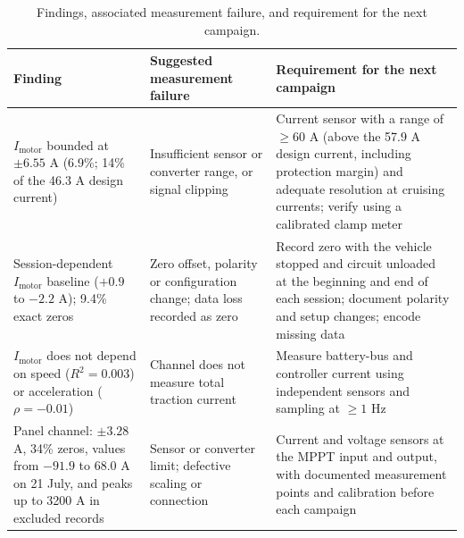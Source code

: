 \documentclass[vehicles,article,submit,moreauthors]{Definitions/mdpi}
\begin{document}
\begin{table}[H]
    \caption{Findings, associated measurement failure, and requirement for the next campaign.\label{tab:hallazgos}}
    \footnotesize
    \setlength{\tabcolsep}{3pt}
    \renewcommand{\arraystretch}{1.1}
    \begin{tabular}{p{4.0cm} p{3.9cm} p{5.6cm}}
        \toprule
        \textbf{Finding} & \textbf{Suggested measurement failure}                                                                                                                                                       & \textbf{Requirement for the next campaign} \\
        \midrule
        $I_{\mathrm{motor}}$ bounded at $\pm 6.55$ A (6.9\%; 14\% of the 46.3 A design current)
                         & Insufficient sensor or converter range, or signal clipping
                         & Current sensor with a range of $\ge 60$ A (above the 57.9 A design current, including protection margin) and adequate resolution at cruising currents; verify using a calibrated clamp meter                                              \\
        Session-dependent $I_{\mathrm{motor}}$ baseline ($+0.9$ to $-2.2$ A); 9.4\% exact zeros
                         & Zero offset, polarity or configuration change; data loss recorded as zero
                         & Record zero with the vehicle stopped and circuit unloaded at the beginning and end of each session; document polarity and setup changes; encode missing data                                                                              \\
        $I_{\mathrm{motor}}$ does not depend on speed ($R^2=0.003$) or acceleration ($\rho=-0.01$)
                         & Channel does not measure total traction current
                         & Measure battery-bus and controller current using independent sensors and sampling at $\ge 1$ Hz                                                                                                                                           \\
        Panel channel: $\pm 3.28$ A, 34\% zeros, values from $-91.9$ to $68.0$ A on 21 July, and peaks up to 3200 A in excluded records
                         & Sensor or converter limit; defective scaling or connection
                         & Current and voltage sensors at the MPPT input and output, with documented measurement points and calibration before each campaign                                                                                                         \\

\end{tabular}
\end{table}
\end{document}
